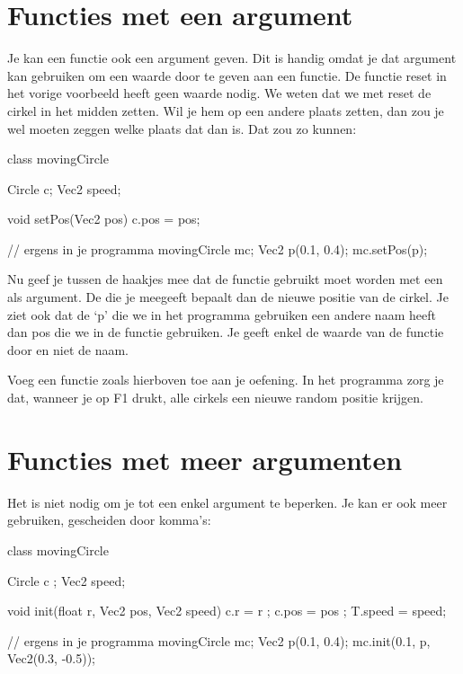 \section{Functies met een argument}
Je kan een functie ook een argument geven. Dit is handig omdat je dat argument kan gebruiken om een waarde door te geven aan een functie. De functie reset in het vorige voorbeeld heeft geen waarde nodig. We weten dat we met reset de cirkel in het midden zetten. Wil je hem op een andere plaats zetten, dan zou je wel moeten zeggen welke plaats dat dan is. Dat zou zo kunnen:

\begin{code}
class movingCircle {
  Circle c;
  Vec2 speed;
  
  void setPos(Vec2 pos) {
    c.pos = pos;
  }
}

// ergens in je programma
movingCircle mc;
Vec2 p(0.1, 0.4);
mc.setPos(p);

\end{code}

Nu geef je tussen de haakjes mee dat de functie gebruikt moet worden met een  als argument. De  die je meegeeft bepaalt dan de nieuwe positie van de cirkel. Je ziet ook dat de  `p' die we in het programma gebruiken een andere naam heeft dan  pos die we in de functie gebruiken. Je geeft enkel de waarde van de functie door en niet de naam. 

\begin{exercise}
Voeg een functie  zoals hierboven toe aan je oefening. In het programma zorg je dat, wanneer je op F1 drukt, alle cirkels een nieuwe random positie krijgen.
\end{exercise}

\section{Functies met meer argumenten}
Het is niet nodig om je tot een enkel argument te beperken. Je kan er ook meer gebruiken, gescheiden door komma's:

\begin{code}
class movingCircle {
  Circle c    ;
  Vec2   speed;
  
  void init(float r, Vec2 pos, Vec2 speed) {
    c.r     = r    ;
    c.pos   = pos  ;
    T.speed = speed;
  }
}

// ergens in je programma
movingCircle mc;
Vec2 p(0.1, 0.4);
mc.init(0.1, p, Vec2(0.3, -0.5));
\end{code}

